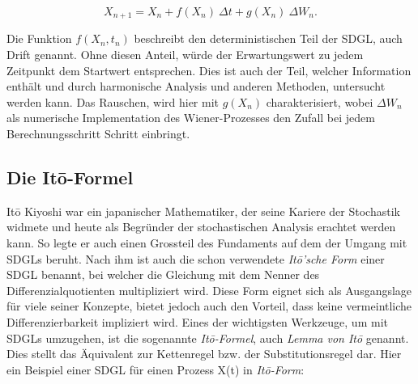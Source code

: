 \begin{equation}
	X_{n+1} = X_n + f(X_n) \ \Delta t + g(X_n) \ \Delta W_n .
\end{equation}

Die Funktion $ f(X_n,t_n) $ beschreibt den deterministischen Teil der SDGL, auch Drift genannt. Ohne diesen Anteil, würde der Erwartungswert zu jedem Zeitpunkt dem Startwert entsprechen. Dies ist auch der Teil, welcher Information enthält und durch harmonische Analysis und anderen Methoden, untersucht werden kann. Das Rauschen, wird hier mit $ g(X_n) $ charakterisiert, wobei $ \Delta W_n $ als numerische Implementation des Wiener-Prozesses den Zufall bei jedem Berechnungsschritt Schritt einbringt.



\subsection{Die Itō-Formel\label{brown:ito}}

Itō Kiyoshi war ein japanischer Mathematiker, der seine Kariere der Stochastik widmete und heute als Begründer der stochastischen Analysis erachtet werden kann. So legte er auch einen Grossteil des Fundaments auf dem der Umgang mit SDGLs beruht. Nach ihm ist auch die schon verwendete \textit{Itō'sche Form} einer SDGL benannt, bei welcher die Gleichung mit dem Nenner des Differenzialquotienten multipliziert wird. Diese Form eignet sich als Ausgangslage für viele seiner Konzepte, bietet jedoch auch den Vorteil, dass keine vermeintliche Differenzierbarkeit impliziert wird.
Eines der wichtigsten Werkzeuge, um mit SDGLs umzugehen, ist die sogenannte \textit{Itō-Formel}, auch \textit{Lemma von Itō} genannt. Dies stellt das Äquivalent zur Kettenregel bzw. der Substitutionsregel dar. Hier ein Beispiel einer SDGL für einen Prozess X(t) in \textit{Itō-Form}:


